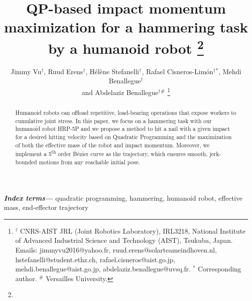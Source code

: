 \documentclass[conference]{IEEEtran}
\providecommand{\keywords}[1]{\textbf{\textit{Index terms---}} #1}
\begin{document}
\title{\LARGE \bf QP-based impact momentum maximization for a hammering task \\
                    by a humanoid robot
\thanks{}
}

\author{%
    Jimmy Vu$^{\dagger}$,
    Ruud Erens$^{\dagger}$,
    Hélène Stefanelli$^{\dagger}$$^{}$,
    Rafael Cisneros-Limón$^{\dagger}$$^{*}$,
    Mehdi Benallegue$^{\dagger}$ \\
    and Abdelaziz Benallegue$^{\dagger}$$^{\#}$%
    \thanks{$^{\dagger}$
    CNRS-AIST JRL (Joint Robotics Laboratory), IRL3218, 
    National Institute of Advanced Industrial Science and Technology (AIST), 
    Tsukuba, Japan. 
    Emails: 
    jimmyvu2016@yahoo.fr, 
    ruud.erens@solarteameindhoven.nl, 
    hstefanelli@student.ethz.ch, 
    rafael.cisneros@aist.go.jp, 
    mehdi.benallegue@aist.go.jp, 
    abdelaziz.benallegue@uvsq.fr. 
    $^{*}$ Corresponding author. $^{\#}$ Versailles University.
    }
}


\maketitle

\begin{abstract}
Humanoid robots can offload repetitive, load-bearing operations that expose workers to cumulative joint stress.
In this paper, we focus on a hammering task with our humanoid robot HRP-5P and we propose a method to hit a nail with a given impact for a desired hitting velocity based on Quadratic Programming and the maximization of both the effective mass of the robot and impact momentum. 
Moreover, we implement a 5\textsuperscript{th} order Bézier curve as the trajectory, which ensures smooth, jerk-bounded motions from any reachable initial pose.
\end{abstract}

    \keywords{
quadratic programming, hammering, humanoid robot, effective mass, end-effector trajectory}
\end{document}
